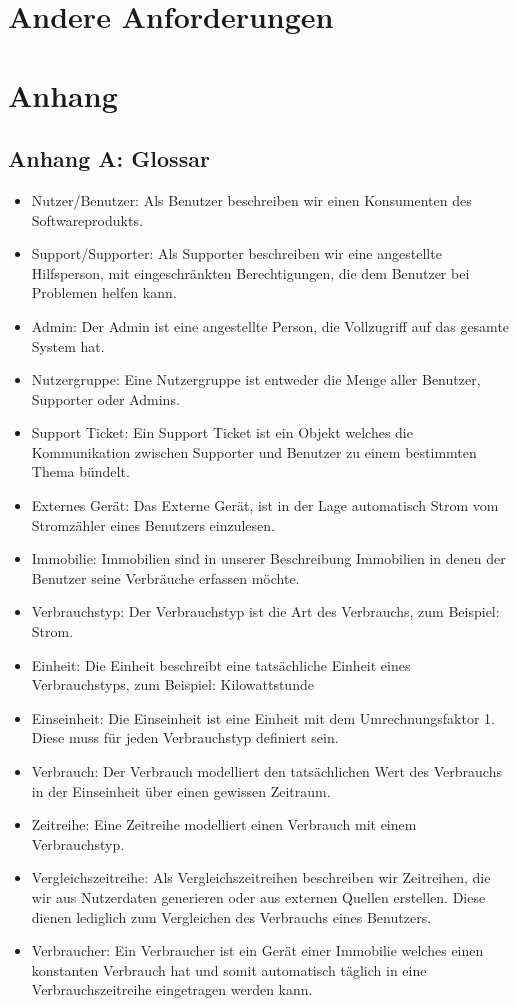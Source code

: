 \section{Andere Anforderungen}
\newpage
\section{Anhang}
\subsection*{Anhang A: Glossar}
\label{glossar}
\begin{itemize}
	\item Nutzer/Benutzer: Als Benutzer beschreiben wir einen Konsumenten des Softwareprodukts.
	\item Support/Supporter: Als Supporter beschreiben wir eine angestellte Hilfsperson, mit eingeschränkten Berechtigungen, die dem Benutzer bei Problemen helfen kann.
	\item Admin: Der Admin ist eine angestellte Person, die Vollzugriff auf das gesamte System hat.
	\item Nutzergruppe: Eine Nutzergruppe ist entweder die Menge aller Benutzer, Supporter oder Admins.
	\item Support Ticket: Ein Support Ticket ist ein Objekt welches die Kommunikation zwischen Supporter und Benutzer zu einem bestimmten Thema bündelt.
	\item Externes Gerät: Das Externe Gerät, ist in der Lage automatisch Strom vom Stromzähler eines Benutzers einzulesen.
	\item Immobilie: Immobilien sind in unserer Beschreibung Immobilien in denen der Benutzer seine Verbräuche erfassen möchte.
	\item Verbrauchstyp: Der Verbrauchstyp ist die Art des Verbrauchs, zum Beispiel: Strom.
	\item Einheit: Die Einheit beschreibt eine tatsächliche Einheit eines Verbrauchstyps, zum Beispiel: Kilowattstunde
	\item Einseinheit: Die Einseinheit ist eine Einheit mit dem Umrechnungsfaktor 1. Diese muss für jeden Verbrauchstyp definiert sein.
	\item Verbrauch: Der Verbrauch modelliert den tatsächlichen Wert des Verbrauchs in der Einseinheit über einen gewissen Zeitraum.
	\item Zeitreihe: Eine Zeitreihe modelliert einen Verbrauch mit einem Verbrauchstyp.
	\item Vergleichszeitreihe: Als Vergleichszeitreihen beschreiben wir Zeitreihen, die wir aus Nutzerdaten generieren oder aus externen Quellen erstellen. Diese dienen lediglich zum Vergleichen des Verbrauchs eines Benutzers.
	\item Verbraucher: Ein Verbraucher ist ein Gerät einer Immobilie welches einen konstanten Verbrauch hat und somit automatisch täglich in eine Verbrauchszeitreihe eingetragen werden kann.
\end{itemize}
